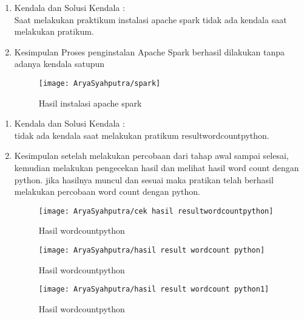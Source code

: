 \clearpage
{}
\begin{enumerate}
\item Kendala dan Solusi
\newline Kendala :\\
Saat melakukan praktikum instalasi apache spark tidak ada kendala saat melakukan pratikum.

\item Kesimpulan
\newline Proses penginstalan Apache Spark berhasil dilakukan tanpa adanya kendala satupun


\begin{figure}[!ht]
\texttt{[image: AryaSyahputra/spark]}
\caption{Hasil instalasi apache spark}
\label{gam:instalasi apache spark}
\end{figure}
\end{enumerate}


\clearpage
{}
\begin{enumerate}
\item Kendala dan Solusi
\newline Kendala :\\
tidak ada kendala saat melakukan pratikum resultwordcountpython.

\item Kesimpulan
\newline setelah melakukan percobaan dari tahap awal sampai selesai, kemudian melakukan pengecekan hasil dan melihat hasil word count dengan python. jika hasilnya muncul dan sesuai maka pratikan telah berhasil melakukan percobaan word count dengan python.


\begin{figure}[!ht]
\texttt{[image: AryaSyahputra/cek hasil resultwordcountpython]}
\caption{Hasil wordcountpython}
\label{gam:wordcountpython}
\end{figure}
\begin{figure}[!ht]
\texttt{[image: AryaSyahputra/hasil result wordcount python]}
\caption{Hasil wordcountpython}
\label{gam:wordcountpython}
\end{figure}
\begin{figure}[!ht]
\texttt{[image: AryaSyahputra/hasil result wordcount python1]}
\caption{Hasil wordcountpython}
\label{gam:wordcountpython}
\end{figure}
\end{enumerate}


